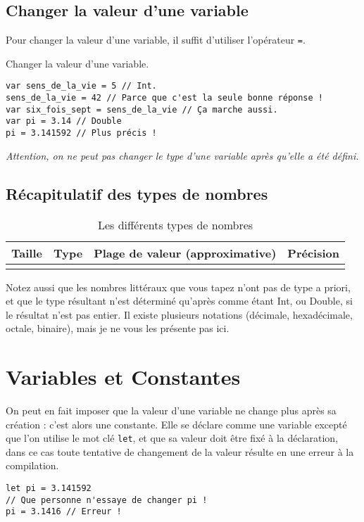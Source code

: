\subsection{Changer la valeur d'une variable}
Pour changer la valeur d'une variable, il suffit d'utiliser l'opérateur \verb"=".
\begin{listing}[h]
\caption{Changer la valeur d'une variable.}
\begin{verbatim}
var sens_de_la_vie = 5 // Int.
sens_de_la_vie = 42 // Parce que c'est la seule bonne réponse !
var six_fois_sept = sens_de_la_vie // Ça marche aussi.
var pi = 3.14 // Double
pi = 3.141592 // Plus précis !
\end{verbatim}
\end{listing}

\emph{Attention, on ne peut pas changer le type d'une variable après qu'elle a été défini.}
\subsection{Récapitulatif des types de nombres}
\begin{longtabu} to \linewidth {|X[3,l,m]|X[1,l,m]|X[4,r,m]|X[2,r,m]|}
\hline Taille & Type & Plage de valeur (approximative) & Précision \\ \hline
\endhead


\caption{Les différents types de nombres}
\end{longtabu}
Notez aussi que les nombres littéraux que vous tapez n'ont pas de type a priori, et que le type résultant n'est déterminé qu'après comme étant Int, ou Double, si le résultat n'est pas entier. Il existe plusieurs notations (décimale, hexadécimale, octale, binaire), mais je ne vous les présente pas ici.
\section{Variables et Constantes}
On peut en fait imposer que la valeur d'une variable ne change plus après sa création :
c'est alors une constante. Elle se déclare comme une variable excepté que l'on utilise le
mot clé \texttt{let}, et que sa valeur doit être fixé à la déclaration, dans ce cas toute tentative de changement de la valeur résulte en une erreur à la compilation.
\begin{listing}[h]
\begin{verbatim}
let pi = 3.141592
// Que personne n'essaye de changer pi !
pi = 3.1416 // Erreur !
\end{verbatim}
\end{listing}

